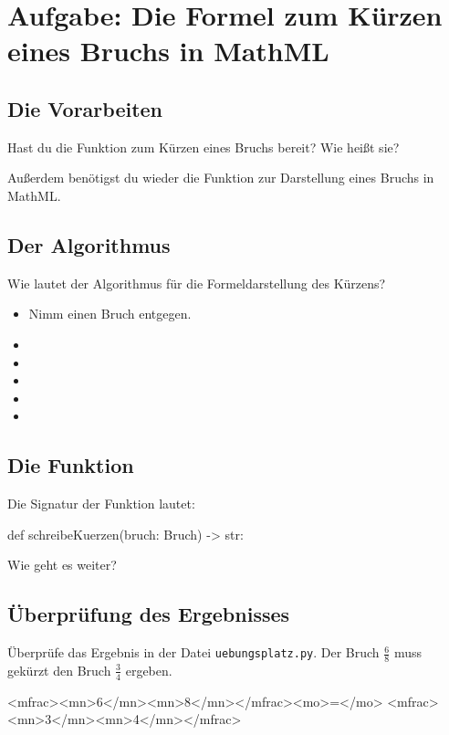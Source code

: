 \section{Aufgabe: Die Formel zum Kürzen eines Bruchs in MathML}

\subsection*{Die Vorarbeiten}

Hast du die Funktion zum Kürzen eines Bruchs bereit? Wie heißt sie?

Außerdem benötigst du wieder die Funktion zur Darstellung eines Bruchs in MathML.

\subsection*{Der Algorithmus}

Wie lautet der Algorithmus für die Formeldarstellung des Kürzens?

{\huge
\begin{itemize}
	\item Nimm einen Bruch entgegen. 
	\item  
	\item  
	\item  
	\item  
	\item  
\end{itemize}
}


\subsection*{Die Funktion}

Die Signatur der Funktion lautet:

\begin{codePython}
def schreibeKuerzen(bruch: Bruch) -> str:
\end{codePython}

Wie geht es weiter?

\subsection*{Überprüfung des Ergebnisses}

Überprüfe das Ergebnis in der Datei \texttt{uebungsplatz.py}. Der Bruch $\frac{6}{8}$ muss gekürzt den Bruch $\frac{3}{4}$ ergeben.

\begin{codeHTML}
<mfrac><mn>6</mn><mn>8</mn></mfrac><mo>=</mo>
	<mfrac><mn>3</mn><mn>4</mn></mfrac>
\end{codeHTML}

